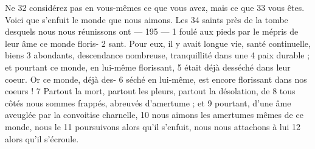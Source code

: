 Ne	 
32	 	considérez pas en vous-mêmes ce que vous avez, mais ce que	 
33	 	vous êtes. Voici que s'enfuit le monde que nous aimons. Les	 
34	 	saints près de la tombe desquels nous nous réunissons ont	 
 	--- 195 ---	 
1	 	foulé aux pieds par le mépris de leur âme ce monde floris-	 
2	 	sant. Pour eux, il y avait longue vie, santé continuelle, biens	 
3	 	abondants, descendance nombreuse, tranquillité dans une	 
4	 	paix durable ; et pourtant ce monde, en lui-même florissant,	 
5	 	était déjà desséché dans leur coeur. Or ce monde, déjà des-	 
6	 	séché en lui-même, est encore florissant dans nos coeurs !	 
7	 	Partout la mort, partout les pleurs, partout la désolation, de	 
8	 	tous côtés nous sommes frappés, abreuvés d'amertume ; et	 
9	 	pourtant, d'une âme aveuglée par la convoitise charnelle,	 
10	 	nous aimons les amertumes mêmes de ce monde, nous le	 
11	 	poursuivons alors qu'il s'enfuit, nous nous attachons à lui	 
12	 	alors qu'il s'écroule.